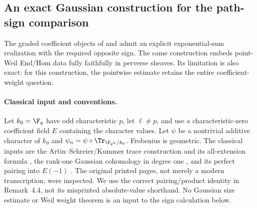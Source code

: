 \subsection{An exact Gaussian construction for the path-sign comparison}
The graded coefficient objects of  and  admit an
explicit exponential-sum realization with the required opposite sign.
The same construction embeds point-Weil End/Hom data fully faithfully
in perverse sheaves. Its limitation is also exact: for this construction,
the pointwise estimate retains the entire coefficient-weight question.

\paragraph{Classical input and conventions.}
Let $k_0=\F_q$ have odd characteristic $p$, let $\ell\ne p$, and use a
characteristic-zero coefficient field $E$ containing the character
values. Let $\psi$ be a nontrivial additive character of $k_0$ and
$\psi_n=\psi\circ\Tr_{\F_{q^n}/k_0}$. Frobenius is geometric.
The classical inputs are the Artin--Schreier/Kummer trace construction
and its all-extension formula \cite[\emph{Sommes trig.},
1.7--1.9, especially (1.9.2)]{SGA45}, the rank-one Gaussian
cohomology in degree one \cite[Propositions~4.2--4.3,
pp.~196--197]{SGA45}, and its perfect pairing into $E(-1)$
\cite[Remark~4.4, p.~197]{SGA45}.
The original printed pages, not merely a modern transcription, were
inspected. We use the correct pairing/product identity in Remark~4.4,
not its misprinted absolute-value shorthand. No Gaussian size estimate
or Weil weight theorem is an input to the sign calculation below.

